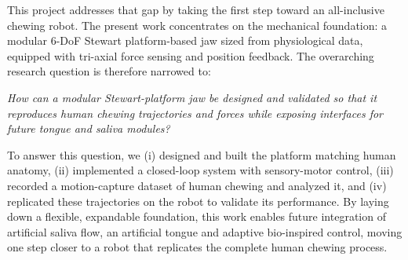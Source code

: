 This project addresses that gap by taking the first step toward an all-inclusive chewing robot. The present work concentrates on the mechanical foundation: a modular 6-DoF Stewart platform-based jaw sized from physiological data, equipped with tri-axial force sensing and position feedback. The overarching research question is therefore narrowed to:

\textit{How can a modular Stewart-platform jaw be designed and validated so that it reproduces human chewing trajectories and forces while exposing interfaces for 
future tongue and saliva modules?}

To answer this question, we (i) designed and built the platform matching human anatomy, (ii) implemented a closed-loop system with sensory-motor control, 
(iii) recorded a motion-capture dataset of human chewing and analyzed it, and (iv) replicated these trajectories on the robot to validate its performance. By laying down a flexible, expandable foundation, this work enables future integration of artificial saliva flow, an artificial tongue and adaptive bio-inspired control, 
moving one step closer to a robot that replicates the complete human chewing process.